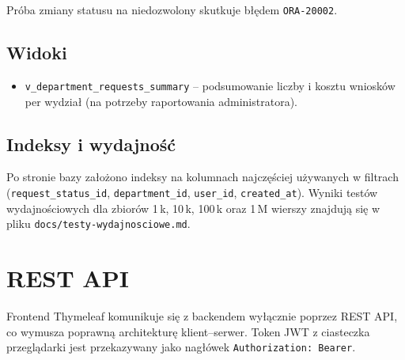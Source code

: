 \documentclass[12pt,a4paper]{article}
\begin{document}
Próba zmiany statusu na niedozwolony skutkuje błędem \texttt{ORA-20002}.


\subsection{Widoki}
\begin{itemize}[leftmargin=*]
  \item \texttt{v\_department\_requests\_summary} -- podsumowanie liczby i kosztu
        wniosków per wydział (na potrzeby raportowania administratora).
\end{itemize}

\subsection{Indeksy i wydajność}
Po stronie bazy założono indeksy na kolumnach najczęściej używanych w filtrach
(\texttt{request\_status\_id}, \texttt{department\_id}, \texttt{user\_id}, \texttt{created\_at}).
Wyniki testów wydajnościowych dla zbiorów 1\,k, 10\,k, 100\,k oraz 1\,M wierszy
znajdują się w pliku \texttt{docs/testy-wydajnosciowe.md}.

\section{REST API}
\label{sec:api}

Frontend Thymeleaf komunikuje się z backendem wyłącznie poprzez REST API, co
wymusza poprawną architekturę klient--serwer. Token JWT z ciasteczka przeglądarki
jest przekazywany jako nagłówek \texttt{Authorization: Bearer}.
\end{document}
